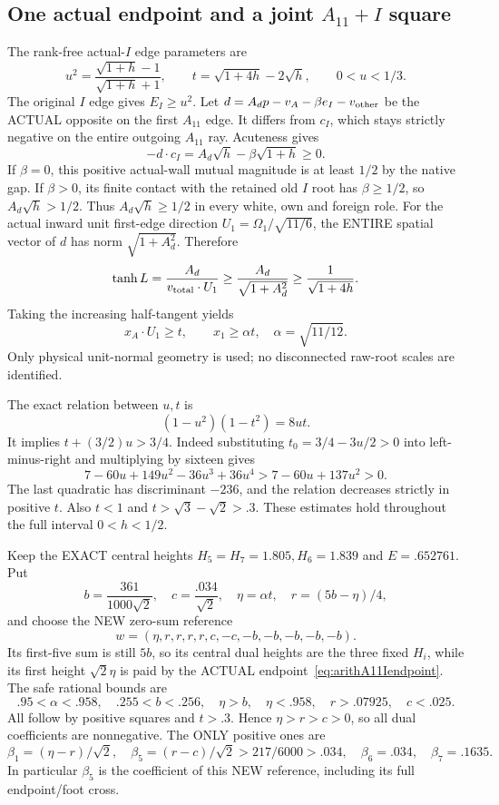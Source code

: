 \documentclass[11pt]{article}
\begin{document}
\subsection[One actual endpoint and a joint A11+I square]{One actual endpoint and a joint \(A_{11}+I\) square}
\label{app:arithA11Ijoint}

The rank-free actual-\(I\) edge parameters are
\[
 u^2={\frac{\sqrt{1+h}-1}{\sqrt{1+h}+1}},\qquad
 t=\sqrt{1+4h}-2\sqrt h,\qquad 0<u<1/3 .
\]
The original \(I\) edge gives \(E_I\ge u^2\).
Let \(d=A_dp-v_A-\beta e_I-v_{\rm other}\)
be the ACTUAL opposite on the first \(A_{11}\)
edge.  It differs from \(c_I\), which stays
strictly negative on the entire outgoing
\(A_{11}\) ray.
Acuteness gives
\[
       -d\cdot c_I=A_d\sqrt h-\beta\sqrt{1+h}\ge0 .
\]
If \(\beta=0\), this positive actual-wall
mutual magnitude is at least \(1/2\)
by the native gap.
If \(\beta>0\), its finite contact with the
retained old \(I\) root has \(\beta\ge1/2\),
so \(A_d\sqrt h>1/2\).
Thus \(A_d\sqrt h\ge1/2\) in every white,
own and foreign role.
For the actual inward unit first-edge direction
\(U_1=\Omega_1/\sqrt{11/6}\), the ENTIRE
spatial vector of \(d\) has norm
\(\sqrt{1+A_d^2}\).
Therefore
\[
 \tanh L={\frac{A_d}{v_{\rm total}\cdot U_1}}
       \ge {\frac{A_d}{\sqrt{1+A_d^2}}}
       \ge {\frac{1}{\sqrt{1+4h}}} .
\]
Taking the increasing half-tangent yields
\[
 x_A\cdot U_1\ge t,\qquad
 x_1\ge\alpha t,\quad\alpha=\sqrt{11/12}.
\tag{A11Iend}\label{eq:arithA11Iendpoint}
\]
Only physical unit-normal geometry is used;
no disconnected raw-root scales are identified.

The exact relation between \(u,t\) is
\[
                    (1-u^2)(1-t^2)=8ut .
\]
It implies \(t+(3/2)u>3/4\).
Indeed substituting \(t_0=3/4-3u/2>0\)
into left-minus-right and multiplying by
sixteen gives
\[
 7-60u+149u^2-36u^3+36u^4
       >7-60u+137u^2>0 .
\]
The last quadratic has discriminant \(-236\),
and the relation decreases strictly in
positive \(t\).
Also \(t<1\) and
\(t>\sqrt3-\sqrt2>.3\).
These estimates hold throughout the full
interval \(0<h<1/2\).

Keep the EXACT central heights
\(H_5=H_7=1.805,H_6=1.839\) and
\(E=.652761\).
Put
\[
 b={\frac{361}{1000\sqrt2}},\quad
 c={\frac{.034}{\sqrt2}},\quad
 \eta=\alpha t,\quad r=(5b-\eta)/4,
\]
and choose the NEW zero-sum reference
\[
                  w=(\eta,r,r,r,r,c,-c,-b,-b,-b,-b,-b).
\]
Its first-five sum is still \(5b\), so its
central dual heights are the three fixed
\(H_i\), while its first height
\(\sqrt2\eta\) is paid by the ACTUAL
endpoint~\eqref{eq:arithA11Iendpoint}.
The safe rational bounds are
\[
 .95<\alpha<.958,\quad .255<b<.256,\quad
 \eta>b,\quad\eta<.958,\quad
 r>.07925,\quad c<.025 .
\]
All follow by positive squares and \(t>.3\).
Hence \(\eta>r>c>0\), so all dual coefficients
are nonnegative.  The ONLY positive ones are
\[
 \beta_1=(\eta-r)/\sqrt2,\quad
 \beta_5=(r-c)/\sqrt2>217/6000>.034,\quad
 \beta_6=.034,\quad\beta_7=.1635 .
\]
In particular \(\beta_5\) is the coefficient
of this NEW reference, including its full
endpoint/foot cross.
\end{document}
